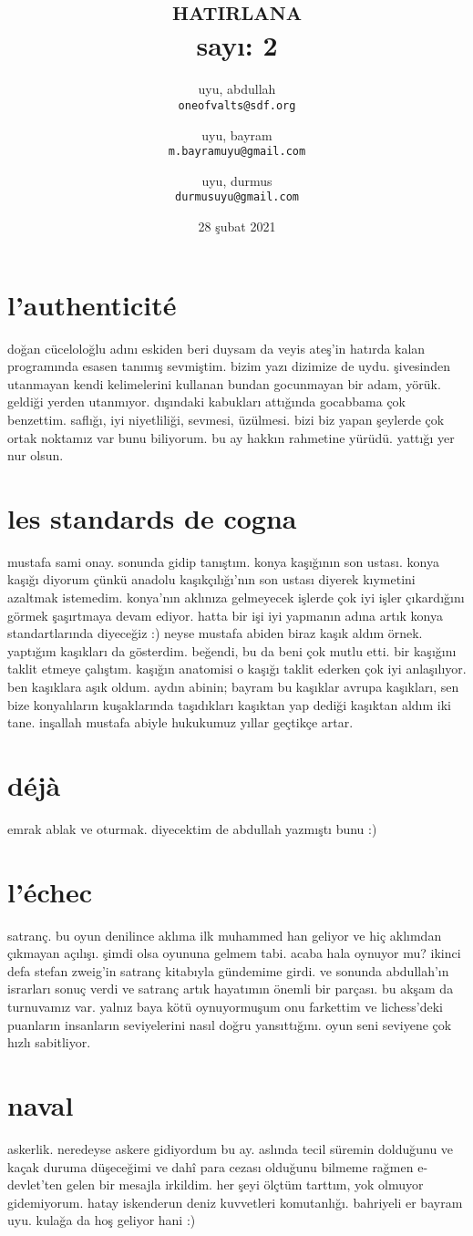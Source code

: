 \documentclass[a4paper, twocolumn]{memoir}
\author{
  uyu, abdullah\\
  \texttt{oneofvalts@sdf.org}
  \and
  uyu, bayram\\
  \texttt{m.bayramuyu@gmail.com}
  \and
  uyu, durmus\\
  \texttt{durmusuyu@gmail.com}
}
\title{\textsc{hatirlana}\\\small sayı: 2}
\date{28 şubat 2021}
\begin{document}
\maketitle
\section{l'authenticité}
doğan cüceloloğlu adını eskiden beri duysam da veyis ateş’in hatırda
kalan programında esasen tanımış sevmiştim. bizim yazı dizimize de uydu.
şivesinden utanmayan kendi kelimelerini kullanan bundan gocunmayan bir
adam, yörük. geldiği yerden utanmıyor. dışındaki kabukları attığında
gocabbama çok benzettim. saflığı, iyi niyetliliği, sevmesi, üzülmesi.
bizi biz yapan şeylerde çok ortak noktamız var bunu biliyorum. bu ay
hakkın rahmetine yürüdü. yattığı yer nur olsun.
\section{les standards de cogna}
mustafa sami onay. sonunda gidip tanıştım. konya kaşığının son ustası.
konya kaşığı diyorum çünkü anadolu kaşıkçılığı’nın son ustası diyerek
kıymetini azaltmak istemedim. konya’nın aklınıza gelmeyecek işlerde çok
iyi işler çıkardığını görmek şaşırtmaya devam ediyor. hatta bir işi iyi
yapmanın adına artık konya standartlarında diyeceğiz :) neyse mustafa
abiden biraz kaşık aldım örnek. yaptığım kaşıkları da gösterdim. beğendi,
bu da beni çok mutlu etti. bir kaşığını taklit etmeye çalıştım. kaşığın
anatomisi o kaşığı taklit ederken çok iyi anlaşılıyor. ben kaşıklara aşık
oldum. aydın abinin; bayram bu kaşıklar avrupa kaşıkları, sen bize
konyalıların kuşaklarında taşıdıkları kaşıktan yap dediği kaşıktan aldım
iki tane. inşallah mustafa abiyle hukukumuz yıllar geçtikçe artar.
\section{déjà}
emrak ablak ve oturmak. diyecektim de abdullah yazmıştı bunu :)
\section{l'échec}
satranç. bu oyun denilince aklıma ilk muhammed han geliyor ve hiç
aklımdan çıkmayan açılışı. şimdi olsa oyununa gelmem tabi. acaba hala
oynuyor mu? ikinci defa stefan zweig’in satranç kitabıyla gündemime
girdi. ve sonunda abdullah’ın israrları sonuç verdi ve satranç artık
hayatımın önemli bir parçası. bu akşam da turnuvamız var. yalnız baya
kötü oynuyormuşum onu farkettim ve lichess’deki puanların insanların
seviyelerini nasıl doğru yansıttığını. oyun seni seviyene çok hızlı
sabitliyor.
\section{naval}
askerlik. neredeyse askere gidiyordum bu ay. aslında tecil süremin
dolduğunu ve kaçak duruma düşeceğimi ve dahî para cezası olduğunu bilmeme
rağmen e-devlet’ten gelen bir mesajla irkildim. her şeyi ölçtüm tarttım,
yok olmuyor gidemiyorum. hatay iskenderun deniz kuvvetleri komutanlığı.
bahriyeli er bayram uyu. kulağa da hoş geliyor hani :)
\end{document}
